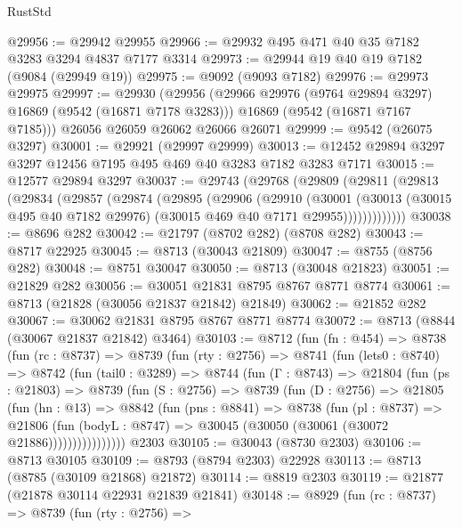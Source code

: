 \begin{lexlean}{RustStd}
\begin{coremodule}
@29956 := @29942 @29955
@29966 := @29932 @495 @471 @40 @35 @7182 @3283 @3294 @4837 @7177 @3314
@29973 := @29944 @19 @40 @19 @7182 (@9084 (@29949 @19))
@29975 := @9092 (@9093 @7182)
@29976 := @29973 @29975
@29997 := @29930
    (@29956
      (@29966 @29976 (@9764 @29894 @3297) @16869 (@9542 (@16871 @7178 @3283)))
      @16869
      (@9542 (@16871 @7167 @7185)))
    @26056
    @26059
    @26062
    @26066
    @26071
@29999 := @9542 (@26075 @3297)
@30001 := @29921 (@29997 @29999)
@30013 := @12452 @29894 @3297 @3297 @12456 @7195 @495 @469 @40 @3283 @7182 @3283 @7171
@30015 := @12577 @29894 @3297
@30037 := @29743
    (@29768
      (@29809
        (@29811
          (@29813
            (@29834
              (@29857
                (@29874
                  (@29895
                    (@29906
                      (@29910
                        (@30001
                          (@30013
                            (@30015 @495 @40 @7182 @29976)
                            (@30015 @469 @40 @7171 @29955)))))))))))))
@30038 := @8696 @282
@30042 := @21797 (@8702 @282) (@8708 @282)
@30043 := @8717 @22925
@30045 := @8713 (@30043 @21809)
@30047 := @8755 (@8756 @282)
@30048 := @8751 @30047
@30050 := @8713 (@30048 @21823)
@30051 := @21829 @282
@30056 := @30051 @21831 @8795 @8767 @8771 @8774
@30061 := @8713 (@21828 (@30056 @21837 @21842) @21849)
@30062 := @21852 @282
@30067 := @30062 @21831 @8795 @8767 @8771 @8774
@30072 := @8713 (@8844 (@30067 @21837 @21842) @3464)
@30103 := @8712
    (fun (fn : @454) =>
    @8738
      (fun (rc : @8737) =>
      @8739
        (fun (rty : @2756) =>
        @8741
          (fun (lets0 : @8740) =>
          @8742
            (fun (tail0 : @3289) =>
            @8744
              (fun (Γ : @8743) =>
              @21804
                (fun (ps : @21803) =>
                @8739
                  (fun (S : @2756) =>
                  @8739
                    (fun (D : @2756) =>
                    @21805
                      (fun (hn : @13) =>
                      @8842
                        (fun (pns : @8841) =>
                        @8738
                          (fun (pl : @8737) =>
                          @21806
                            (fun (bodyL : @8747) =>
                            @30045 (@30050 (@30061 (@30072 @21886))))))))))))))))
    @2303
@30105 := @30043 (@8730 @2303)
@30106 := @8713 @30105
@30109 := @8793 (@8794 @2303) @22928
@30113 := @8713 (@8785 (@30109 @21868) @21872)
@30114 := @8819 @2303
@30119 := @21877 (@21878 @30114 @22931 @21839 @21841)
@30148 := @8929
    (fun (rc : @8737) =>
    @8739
      (fun (rty : @2756) =>

\end{coremodule}
\end{lexlean}
